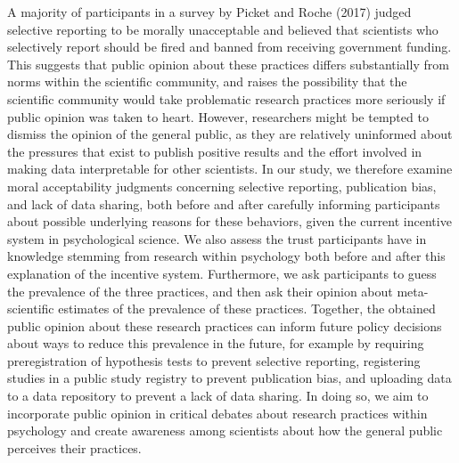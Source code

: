\documentclass[
  man,floatsintext]{apa7}
\begin{document}
A majority of participants in a survey by Picket and Roche (2017) judged selective
reporting to be morally unacceptable and believed that scientists who selectively report
should be fired and banned from receiving government funding. This suggests that public
opinion about these practices differs substantially from norms within the scientific
community, and raises the possibility that the scientific community would take problematic
research practices more seriously if public opinion was taken to heart.
However, researchers might be tempted to dismiss the opinion of the general public, as
they are relatively uninformed about the pressures that exist to publish positive results and
the effort involved in making data interpretable for other scientists. In our study, we
therefore examine moral acceptability judgments concerning selective reporting,
publication bias, and lack of data sharing, both before and after carefully informing
participants about possible underlying reasons for these behaviors, given the current
incentive system in psychological science. We also assess the trust participants have in
knowledge stemming from research within psychology both before and after this
explanation of the incentive system.
Furthermore, we ask participants to guess the prevalence of the three practices, and then
ask their opinion about meta-scientific estimates of the prevalence of these practices.
Together, the obtained public opinion about these research practices can inform future
policy decisions about ways to reduce this prevalence in the future, for example by
requiring preregistration of hypothesis tests to prevent selective reporting, registering
studies in a public study registry to prevent publication bias, and uploading data to a data
repository to prevent a lack of data sharing. In doing so, we aim to incorporate public
opinion in critical debates about research practices within psychology and create
awareness among scientists about how the general public perceives their practices.
\end{document}
